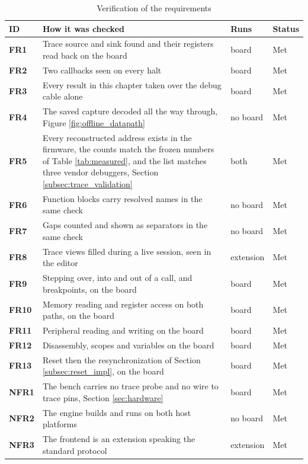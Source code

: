 \begin{table}[htbp]
    \centering
    \caption{Verification of the requirements}
    \label{tab:verification}
    \begin{tabularx}{\linewidth}{| @{}>{\hsize\bfseries}Y | >{\hsize}Y | >{\hsize}Y | >{\hsize}Y@{} |}
        \hline
        ID & \textbf{How it was checked} & \textbf{Runs} & \textbf{Status} \\
        \hline
        FR1 & Trace source and sink found and their registers read back on the board & board & Met \\
        \hline
        FR2 & Two callbacks seen on every halt & board & Met \\
        \hline
        FR3 & Every result in this chapter taken over the debug cable alone & board & Met \\
        \hline
        FR4 & The saved capture decoded all the way through, Figure \ref{fig:offline_datapath} & no board & Met \\
        \hline
        FR5 & Every reconstructed address exists in the firmware, the counts match the frozen numbers of Table \ref{tab:measured}, and the list matches three vendor debuggers, Section \ref{subsec:trace_validation} & both & Met \\
        \hline
        FR6 & Function blocks carry resolved names in the same check & no board & Met \\
        \hline
        FR7 & Gaps counted and shown as separators in the same check & no board & Met \\
        \hline
        FR8 & Trace views filled during a live session, seen in the editor & extension & Met \\
        \hline
        FR9 & Stepping over, into and out of a call, and breakpoints, on the board & board & Met \\
        \hline
        FR10 & Memory reading and register access on both paths, on the board & board & Met \\
        \hline
        FR11 & Peripheral reading and writing on the board & board & Met \\
        \hline
        FR12 & Disassembly, scopes and variables on the board & board & Met \\
        \hline
        FR13 & Reset then the resynchronization of Section \ref{subsec:reset_impl}, on the board & board & Met \\
        \hline
        NFR1 & The bench carries no trace probe and no wire to trace pins, Section \ref{sec:hardware} & board & Met \\
        \hline
        NFR2 & The engine builds and runs on both host platforms & no board & Met \\
        \hline
        NFR3 & The frontend is an extension speaking the standard protocol & extension & Met \\
        \hline
    \end{tabularx}
\end{table}

